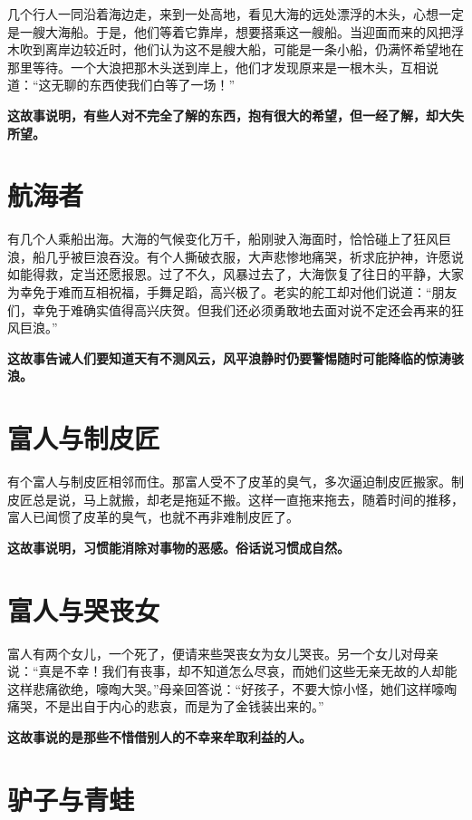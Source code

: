 几个行人一同沿着海边走，来到一处高地，看见大海的远处漂浮的木头，心想一定是一艘大海船。于是，他们等着它靠岸，想要搭乘这一艘船。当迎面而来的风把浮木吹到离岸边较近时，他们认为这不是艘大船，可能是一条小船，仍满怀希望地在那里等待。一个大浪把那木头送到岸上，他们才发现原来是一根木头，互相说道：“这无聊的东西使我们白等了一场！”

{\bfseries \color{red}这故事说明，有些人对不完全了解的东西，抱有很大的希望，但一经了解，却大失所望。}

\section{航海者}

有几个人乘船出海。大海的气候变化万千，船刚驶入海面时，恰恰碰上了狂风巨浪，船几乎被巨浪吞没。有个人撕破衣服，大声悲惨地痛哭，祈求庇护神，许愿说如能得救，定当还愿报恩。过了不久，风暴过去了，大海恢复了往日的平静，大家为幸免于难而互相祝福，手舞足蹈，高兴极了。老实的舵工却对他们说道：“朋友们，幸免于难确实值得高兴庆贺。但我们还必须勇敢地去面对说不定还会再来的狂风巨浪。”

{\bfseries \color{red}这故事告诫人们要知道天有不测风云，风平浪静时仍要警惕随时可能降临的惊涛骇浪。}

\section{富人与制皮匠}

有个富人与制皮匠相邻而住。那富人受不了皮革的臭气，多次逼迫制皮匠搬家。制皮匠总是说，马上就搬，却老是拖延不搬。这样一直拖来拖去，随着时间的推移，富人已闻惯了皮革的臭气，也就不再非难制皮匠了。

{\bfseries \color{red}这故事说明，习惯能消除对事物的恶感。俗话说习惯成自然。}

\section{富人与哭丧女}

富人有两个女儿，一个死了，便请来些哭丧女为女儿哭丧。另一个女儿对母亲说：“真是不幸！我们有丧事，却不知道怎么尽哀，而她们这些无亲无故的人却能这样悲痛欲绝，嚎啕大哭。”母亲回答说：“好孩子，不要大惊小怪，她们这样嚎啕痛哭，不是出自于内心的悲哀，而是为了金钱装出来的。”

{\bfseries \color{red}这故事说的是那些不惜借别人的不幸来牟取利益的人。}

\section{驴子与青蛙}

